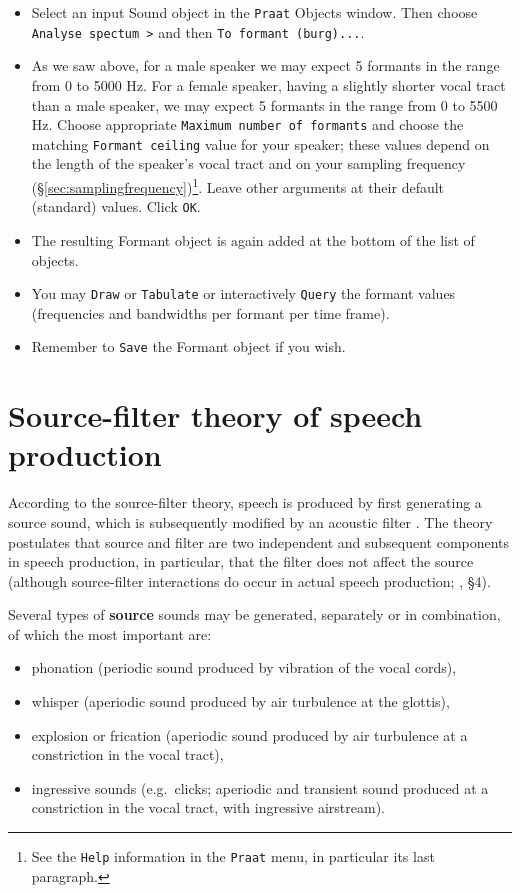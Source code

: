 \documentclass[
]{book}
\begin{document}
\begin{itemize}
\item
  Select an input Sound object in the \texttt{Praat} Objects window. Then choose \texttt{Analyse\ spectum\ \textgreater{}} and then \texttt{To\ formant\ (burg)...}.
\item
  As we saw above, for a male speaker we may expect 5 formants in the range from 0 to 5000 Hz. For a female speaker, having a slightly shorter vocal tract than a male speaker, we may expect 5 formants in the range from 0 to 5500 Hz. Choose appropriate \texttt{Maximum\ number\ of\ formants} and choose the matching \texttt{Formant\ ceiling} value for your speaker; these values depend on the length of the speaker's vocal tract and on your sampling frequency (§\ref{sec:samplingfrequency})\footnote{See the \texttt{Help} information in the \texttt{Praat} menu, in particular its last paragraph.}.
  Leave other arguments at their default (standard) values. Click \texttt{OK}.
\item
  The resulting Formant object is again added at the bottom of the list of objects.
\item
  You may \texttt{Draw} or \texttt{Tabulate} or interactively \texttt{Query} the formant values (frequencies and bandwidths per formant per time frame).
\item
  Remember to \texttt{Save} the Formant object if you wish.
\end{itemize}

\section{Source-filter theory of speech production}\label{sec:sourcefilter}

According to the source-filter theory, speech is produced by first generating a source sound, which is subsequently modified by an acoustic filter \citep{Fant_1970}. The theory postulates that source and filter are two independent and subsequent components in speech production, in particular, that the filter does not affect the source (although source-filter interactions do occur in actual speech production; \citet{Tokuda_2021}, §4).

Several types of \textbf{source} sounds may be generated, separately or in combination, of which the most important are:

\begin{itemize}
\item
  phonation (periodic sound produced by vibration of the vocal cords),
\item
  whisper (aperiodic sound produced by air turbulence at the glottis),
\item
  explosion or frication (aperiodic sound produced by air turbulence at a constriction in the vocal tract),
\item
  ingressive sounds (e.g.~clicks; aperiodic and transient sound produced at a constriction in the vocal tract, with ingressive airstream).
\end{itemize}
\end{document}
